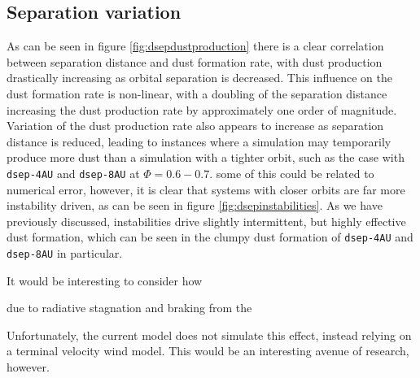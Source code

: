 
\subsection{Separation variation}


As can be seen in figure \ref{fig:dsepdustproduction} there is a clear correlation between separation distance and dust formation rate, with dust production drastically increasing as orbital separation is decreased.
This influence on the dust formation rate is non-linear, with a doubling of the separation distance increasing the dust production rate by approximately one order of magnitude.
Variation of the dust production rate also appears to increase as separation distance is reduced, leading to instances where a simulation may temporarily produce more dust than a simulation with a tighter orbit, such as the case with \texttt{dsep-4AU} and \texttt{dsep-8AU} at $\Phi = 0.6-0.7$.
some of this could be related to numerical error, however, it is clear that systems with closer orbits are far more instability driven, as can be seen in figure \ref{fig:dsepinstabilities}.
As we have previously discussed, instabilities drive slightly intermittent, but highly effective dust formation, which can be seen in the clumpy dust formation of \texttt{dsep-4AU} and \texttt{dsep-8AU} in particular.

It would be interesting to consider how 

due to radiative stagnation and braking from the 

Unfortunately, the current model does not simulate this effect, instead relying on a terminal velocity wind model. This would be an interesting avenue of research, however.



